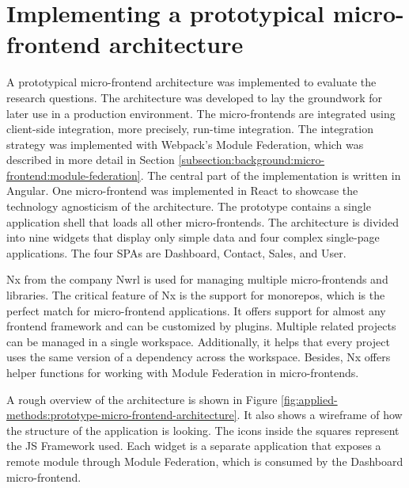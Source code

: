 \section{Implementing a prototypical micro-frontend architecture}\label{section:applied-methods:prototypical-implementation}

A prototypical micro-frontend architecture was implemented to evaluate the research questions. The architecture was developed to lay the groundwork for later use in a production environment. The micro-frontends are integrated using client-side integration, more precisely, run-time integration. The integration strategy was implemented with Webpack's Module Federation, which was described in more detail in Section \ref{subsection:background:micro-frontend:module-federation}. The central part of the implementation is written in Angular. One micro-frontend was implemented in React to showcase the technology agnosticism of the architecture. The prototype contains a single application shell that loads all other micro-frontends. The architecture is divided into nine widgets that display only simple data and four complex single-page applications. The four \acp{SPA} are Dashboard, Contact, Sales, and User.

\bigskip

\noindent Nx from the company Nwrl is used for managing multiple micro-frontends and libraries. The critical feature of Nx is the support for monorepos, which is the perfect match for micro-frontend applications. It offers support for almost any frontend framework and can be customized by plugins. Multiple related projects can be managed in a single workspace. Additionally, it helps that every project uses the same version of a dependency across the workspace. Besides, Nx offers helper functions for working with Module Federation in micro-frontends. \cite{misc:-:applied-methods:intro-to-nx}

\bigskip

\noindent A rough overview of the architecture is shown in Figure \ref{fig:applied-methods:prototype-micro-frontend-architecture}. It also shows a wireframe of how the structure of the application is looking. The icons inside the squares represent the \ac{JS} Framework used. Each widget is a separate application that exposes a remote module through Module Federation, which is consumed by the Dashboard micro-frontend.

